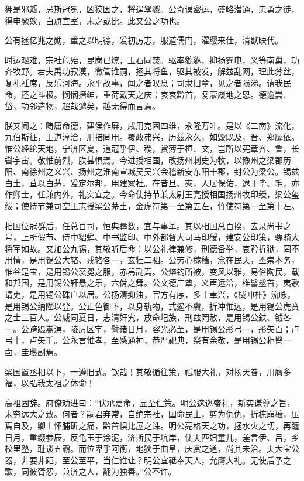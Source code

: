 \documentclass[12pt,UTF8]{ctexbook}
\begin{document}
狎是邪甗，忌斯冠冕，凶狡因之，将逞孥戮。公奇谟密运，盛略潜通，忠勇之徒，得申厥效，白旗宣室，未之或比。此又公之功也。

公有拯亿兆之勋，重之以明德，爰初厉志，服道儒门，濯缨来仕，清猷映代。

时运艰难，宗社危殆，昆岗已燎，玉石同焚。驱率貔貅，抑扬霆电，义等南巢，功齐牧野。若夫禹功寂漠，微管谁嗣，拯其将鱼，驱其被发，解兹乱网，理此棼丝，复礼衽席，反乐河海。永平故事，闻之者叹息；司隶旧章，见之者陨涕。请我民命，还之斗极。悯悯搢绅，重荷戴天之庆；哀哀黔首，复蒙履地之恩。德逾嵩、岱，功邻造物，超哉邈矣，越无得而言焉。

朕又闻之：畴庸命德，建侯作屏，咸用克固四维，永隆万叶。是以《二南》流化，九伯斯征，王道淳洽，刑措罔用。覆政弗兴，历兹永久，如毁既及，晋、郑靡依。惟公经纶天地，宁济区夏，道冠乎伊、稷，赏薄于桓、文，岂所以宪章齐、鲁，长辔宇宙。敬惟前烈，朕甚惧焉。今进授相国，改扬州刺史为牧，以豫州之梁郡历阳、南徐州之义兴、扬州之淮南宣城吴吴兴会稽新安东阳十郡，封公为梁公。锡兹白土，苴以白茅，爰定尔邦，用建冢社。在昔旦、奭，入居保佑，逮于毕、毛，亦作卿士，任兼内外，礼实宜之。今命使持节兼太尉王亮授相国扬州牧印绶，梁公玺绂；使持节兼司空王志授梁公茅土，金虎符第一至第五左，竹使符第一至第十左。

相国位冠群后，任总百司，恒典彝数，宜与事革。其以相国总百揆，去录尚书之号，上所假节、侍中貂蝉、中书监印、中外都督大司马印绶，建安公印策，骠骑大将军如故。又加公九锡，其敬听后命：以公礼律兼修，刑德备举，哀矜折狱，罔不用情，是用锡公大辂、戎辂各一，玄牡二驷。公劳心稼穑，念在民天，丕崇本务，惟谷是宝，是用锡公衮冕之服，赤舄副焉。公熔钧所被，变风以雅，易俗陶民，载和邦国，是用锡公轩悬之乐，六佾之舞。公文德广覃，义声远洽，椎髻髽首，夷歌请吏，是用锡公硃户以居。公扬清抑浊，官方有序，多士聿兴，《棫呻朴》流咏，是用锡公纳陛以登。公正色御下，以身轨物，式遏不虞，折冲惟远，是用锡公虎贲之士三百人。公威同夏日，志清奸宄，放命圮族，刑兹罔赦，是用锡公鈇、钺各一。公跨蹑嵩溟，陵厉区宇，譬诸日月，容光必至，是用锡公彤弓一，彤矢百；卢弓十，卢矢千。公永言惟孝，至感通神，恭严祀典，祭有余敬，是用锡公秬鬯一卣，圭瓒副焉。

梁国置丞相以下，一遵旧式。钦哉！其敬循往策，祗服大礼，对扬天眷，用膺多福，以弘我太祖之休命！

高祖固辞。府僚劝进曰：“伏承嘉命，显至伫策。明公逡巡盛礼，斯实谦尊之旨，未穷远大之致。何者？嗣君弃常，自绝宗社，国命民主，剪为仇仇，折栋崩榱，压焉自及，卿士怀脯斫之痛，黔首惧比屋之诛。明公亮格天之功，拯水火之切，再躔日月，重缀参辰，反龟玉于涂泥，济斯民于坑岸，使夫匹妇童儿，羞言伊、吕，乡校里塾，耻谈五霸。而位卑乎阿衡，地狭于曲阜，庆赏之道，尚其未洽。夫大宝公器，非要非距，至公至平，当仁谁让？明公宜祗奉天人，允膺大礼。无使后予之歌，同彼胥怨，兼济之人，翻为独善。”公不许。
\end{document}
